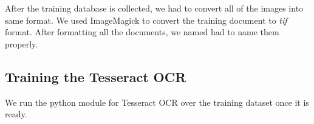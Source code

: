 \documentclass{standalone}
\begin{document}
After the training database is collected, we had to convert all of the images into same format. We used ImageMagick to convert the training document to {\it tif} format. After formatting all the documents, we named had to name them properly. 

\subsection{Training the Tesseract OCR}
We run the python module for Tesseract OCR over the training dataset once it is ready. 
\end{document}
